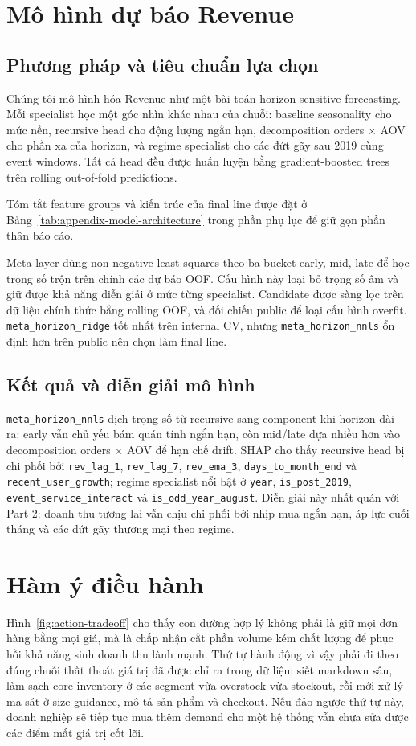 \documentclass{article}
\begin{document}
\section{Mô hình dự báo Revenue}
\subsection{Phương pháp và tiêu chuẩn lựa chọn}
Chúng tôi mô hình hóa Revenue như một bài toán horizon-sensitive forecasting. Mỗi specialist học một góc nhìn khác nhau của chuỗi: baseline seasonality cho mức nền, recursive head cho động lượng ngắn hạn, decomposition orders $\times$ AOV cho phần xa của horizon, và regime specialist cho các đứt gãy sau 2019 cùng event windows. Tất cả head đều được huấn luyện bằng gradient-boosted trees trên rolling out-of-fold predictions.

Tóm tắt feature groups và kiến trúc của final line được đặt ở Bảng~\ref{tab:appendix-model-architecture} trong phần phụ lục để giữ gọn phần thân báo cáo.

Meta-layer dùng non-negative least squares theo ba bucket early, mid, late để học trọng số trộn trên chính các dự báo OOF. Cấu hình này loại bỏ trọng số âm và giữ được khả năng diễn giải ở mức từng specialist. Candidate được sàng lọc trên dữ liệu chính thức bằng rolling OOF, và đối chiếu public để loại cấu hình overfit. \texttt{meta\_horizon\_ridge} tốt nhất trên internal CV, nhưng \texttt{meta\_horizon\_nnls} ổn định hơn trên public nên chọn làm final line.

\subsection{Kết quả và diễn giải mô hình}
\texttt{meta\_horizon\_nnls} dịch trọng số từ recursive sang component khi horizon dài ra: early vẫn chủ yếu bám quán tính ngắn hạn, còn mid/late dựa nhiều hơn vào decomposition orders $\times$ AOV để hạn chế drift. SHAP cho thấy recursive head bị chi phối bởi \texttt{rev\_lag\_1}, \texttt{rev\_lag\_7}, \texttt{rev\_ema\_3}, \texttt{days\_to\_month\_end} và \texttt{recent\_user\_growth}; regime specialist nổi bật ở \texttt{year}, \texttt{is\_post\_2019}, \texttt{event\_service\_interact} và \texttt{is\_odd\_year\_august}. Diễn giải này nhất quán với Part 2: doanh thu tương lai vẫn chịu chi phối bởi nhịp mua ngắn hạn, áp lực cuối tháng và các đứt gãy thương mại theo regime.

\section{Hàm ý điều hành}
Hình~\ref{fig:action-tradeoff} cho thấy con đường hợp lý không phải là giữ mọi đơn hàng bằng mọi giá, mà là chấp nhận cắt phần volume kém chất lượng để phục hồi khả năng sinh doanh thu lành mạnh. Thứ tự hành động vì vậy phải đi theo đúng chuỗi thất thoát giá trị đã được chỉ ra trong dữ liệu: siết markdown sâu, làm sạch core inventory ở các segment vừa overstock vừa stockout, rồi mới xử lý ma sát ở size guidance, mô tả sản phẩm và checkout. Nếu đảo ngược thứ tự này, doanh nghiệp sẽ tiếp tục mua thêm demand cho một hệ thống vẫn chưa sửa được các điểm mất giá trị cốt lõi.
\end{document}
